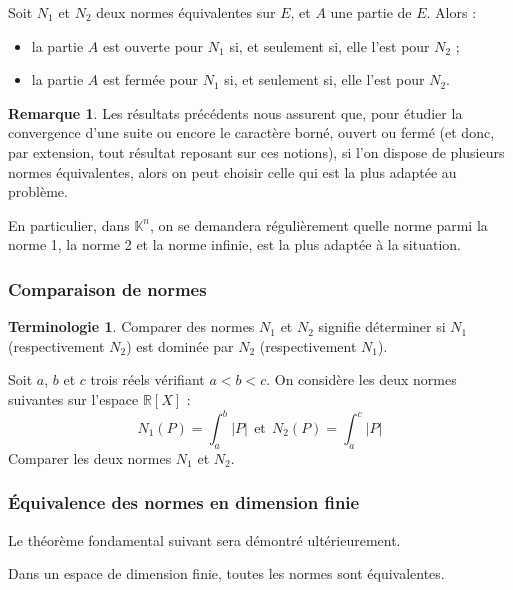 \documentclass[french]{article}
\newcommand{\R}{\mathbb{R}}
\newcommand{\K}{\mathbb{K}}
\theoremstyle{plain}
\theoremstyle{definition}
\newtheorem*{rmq}{Remarque}
\newtheorem*{terminologie}{Terminologie}
\theoremstyle{remark}
\begin{document}
\begin{prop}%
	Soit $N_1$ et $N_2$ deux normes équivalentes sur $E$, et $A$ une partie de $E$. Alors :
	\begin{itemize}
		\item la partie $A$ est ouverte pour $N_1$ si, et seulement si, elle l'est pour $N_2$ ;
		\item la partie $A$ est fermée pour $N_1$ si, et seulement si, elle l'est pour $N_2$.
	\end{itemize}
\end{prop}

\begin{rmq}
	Les résultats précédents nous assurent que, pour étudier la convergence d'une suite ou encore le caractère borné, ouvert ou fermé (et donc, par extension, tout résultat reposant sur ces notions), si l'on dispose de plusieurs normes équivalentes, alors on peut choisir celle qui est la plus adaptée au problème.
\end{rmq}

\begin{met}
	En particulier, dans $\K^n$, on se demandera régulièrement quelle norme parmi la norme 1, la norme 2 et la norme infinie, est la plus adaptée à la situation.
\end{met}

\subsubsection*{Comparaison de normes}

\begin{terminologie}
	Comparer des normes $N_1$ et $N_2$ signifie déterminer si $N_1$ (respectivement $N_2$) est dominée par $N_2$ (respectivement $N_1$).
\end{terminologie}

\begin{exo}
	Soit $a$, $b$ et  $c$ trois réels vérifiant $a<b<c$. On considère les deux normes suivantes sur l'espace $\R[X]$ : $$N_1(P)=\int_{a}^{b}\lvert P\rvert\ \ \text{et}\ \ N_2(P)=\int_{a}^{c}\lvert P\rvert$$
	Comparer les deux normes $N_1$ et $N_2$.
\end{exo}

\subsubsection*{Équivalence des normes en dimension finie}

Le théorème fondamental suivant sera démontré ultérieurement.

\begin{thm}%
	Dans un espace de dimension finie, toutes les normes sont équivalentes.
\end{thm}
\end{document}

